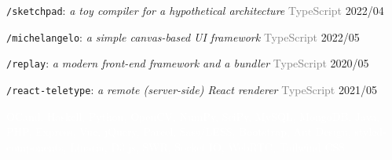 \documentclass[10pt]{article}
\begin{document}
\vspace{0.5em}
\texttt{/sketchpad}: \textit{a toy compiler for a hypothetical architecture} \hfill \textcolor{gray}{TypeScript} 2022/04

\vspace{0.5em}
\texttt{/michelangelo}: \textit{a simple canvas-based UI framework} \hfill \textcolor{gray}{TypeScript}  2022/05

\vspace{0.5em}
\texttt{/replay}: \textit{a modern front-end framework and a bundler} \hfill \textcolor{gray}{TypeScript} 2020/05

\vspace{0.5em}
\texttt{/react-teletype}: \textit{a remote (server-side) React renderer} \hfill \textcolor{gray}{TypeScript} 2021/05

\vspace{2em}
\textcolor{white}{OCaml, Haskell, Python, OpenCV, NumPy, SciPy,  MySQL, MongoDB, Java, PHP, Express, Vue, jQuery, Parcel, Sass/LESS, Bootstrap, Ant Design, styled-components, Linaria, D3.js, SWR, Socket.IO, WebRTC, Tailwind CSS}
\end{document}
